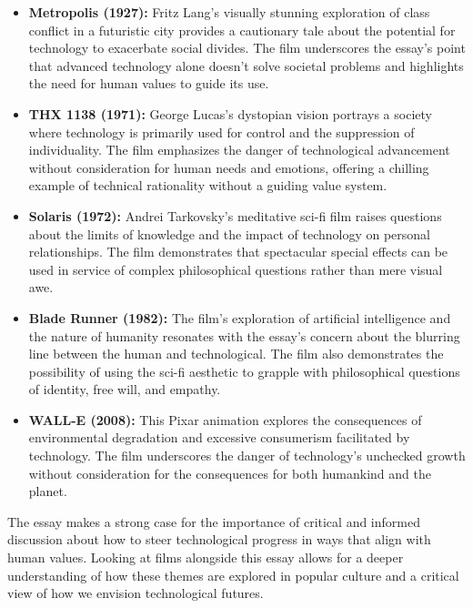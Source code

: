\documentclass[11pt,fleqn]{book}
\begin{document}
\begin{itemize}
\item \textbf{Metropolis (1927):} Fritz Lang's visually stunning exploration of class conflict in a futuristic city provides a cautionary tale about the potential for technology to exacerbate social divides. The film underscores the essay's point that advanced technology alone doesn't solve societal problems and highlights the need for human values to guide its use.

\item \textbf{THX 1138 (1971):} George Lucas's dystopian vision portrays a society where technology is primarily used for control and the suppression of individuality.  The film emphasizes the danger of technological advancement without consideration for human needs and emotions, offering a chilling example of technical rationality without a guiding value system.

\item \textbf{Solaris (1972):} Andrei Tarkovsky's meditative sci-fi film raises questions about the limits of knowledge and the impact of technology on personal relationships. The film demonstrates that spectacular special effects can be used in service of complex philosophical questions rather than mere visual awe.

\item \textbf{Blade Runner (1982):} The film's exploration of artificial intelligence and the nature of humanity resonates with the essay's concern about the blurring line between the human and technological. The film also demonstrates the possibility of using the sci-fi aesthetic to grapple with philosophical questions of identity, free will, and empathy.

\item \textbf{WALL-E (2008):} This Pixar animation explores the consequences of environmental degradation and excessive consumerism facilitated by technology. The film underscores the danger of technology's unchecked growth without consideration for the consequences for both humankind and the planet. 
\end{itemize}

\vspace{5pt}

The essay makes a strong case for the importance of critical and informed discussion about how to steer technological progress in ways that align with human values.  Looking at films alongside this essay allows for a deeper understanding of how these themes are explored in popular culture and a critical view of how we envision technological futures. 
\end{document}

